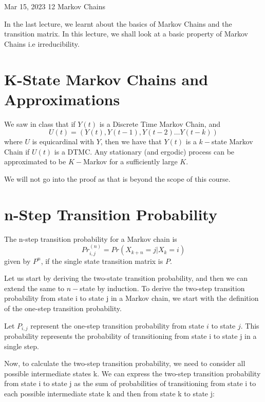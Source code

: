 \documentclass[a4paper,11pt]{scrarticle}
\begin{document}
           {Mar 15, 2023}                    		%
           {12}                                      %
           {Markov Chains}							%

\noindent
In the last lecture, we learnt about the basics of Markov Chains and the transition matrix. In this lecture, we shall look at a basic property of Markov Chains i.e irreducibility.

\section{K-State Markov Chains and Approximations}
\begin{theorem}
We saw in class that if $Y(t)$ is a Discrete Time Markov Chain, and 
\[U(t) = (Y(t), Y(t-1), Y(t-2) \ldots Y(t-k))\]
where $U$ is equicardinal with $Y$, then we have that $Y(t)$ is a $k-$state Markov Chain if $U(t)$ is a DTMC. Any stationary (and ergodic) process can be approximated to be $K-$Markov for a sufficiently large $K$.
\end{theorem}
We will not go into the proof as that is beyond the scope of this course.

\section{n-Step Transition Probability}
\begin{theorem}
The n-step transition probability for a Markov chain is 
\[Pr_{i,j}^{(n)} = Pr(X_{k+n} = j | X_k = i)\]
given by $P^n$, if the single state transition matrix is $P$.
\end{theorem}
Let us start by deriving the two-state transition probability, and then we can extend the same to $n-$state by induction.
To derive the two-step transition probability from state i to state j in a Markov chain, we start with the definition of the one-step transition probability.

Let $P_{i,j}$ represent the one-step transition probability from state $i$ to state $j$. This probability represents the probability of transitioning from state i to state j in a single step.

Now, to calculate the two-step transition probability, we need to consider all possible intermediate states k. We can express the two-step transition probability from state i to state j as the sum of probabilities of transitioning from state i to each possible intermediate state k and then from state k to state j:
\end{document}
